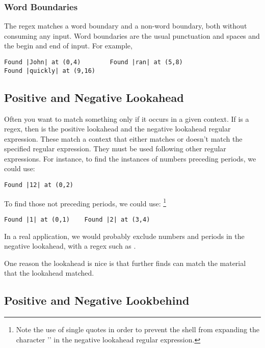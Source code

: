 \subsubsection{Word Boundaries}

The regex  matches a word boundary and  a
non-word boundary, both without consuming any input.  Word boundaries
are the usual punctuation and spaces and the begin and end of input.
For example,
%
\begin{verbatim}
Found |John| at (0,4)        Found |ran| at (5,8)    
Found |quickly| at (9,16)
\end{verbatim}


\subsection{Positive and Negative Lookahead}

Often you want to match something only if it occurs in a given
context.  If  is a regex, then  is
the positive lookahead and  the negative
lookahead regular expression.  These match a context that either
matches or doesn't match the specified regular expression.  They
must be used following other regular expressions.  For instance,
to find the instances of numbers preceding periods, we could use:
%
\begin{verbatim}
Found |12| at (0,2)
\end{verbatim}
%
To find those not preceding periods, we could use:%
%
\footnote{Note the use of single quotes in order to prevent the shell from expanding the character '\code{!}' in the negative lookahead regular expression.}
%
%
\begin{verbatim}
Found |1| at (0,1)    Found |2| at (3,4)
\end{verbatim}

In a real application, we would probably exclude numbers and periods
in the negative lookahead, with a regex such as
.

One reason the lookahead is nice is that further finds can match
the material that the lookahead matched.

\subsection{Positive and Negative Lookbehind}\label{section:regex-lookbehind}

